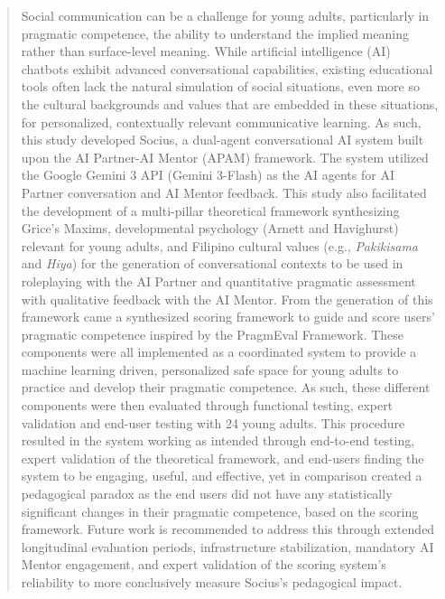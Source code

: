 %
%
%                 

\begin{abstract}

Social communication can be a challenge for young adults, particularly in pragmatic competence, the ability to understand the implied meaning rather than surface-level meaning. While artificial intelligence (AI) 
chatbots exhibit advanced conversational capabilities, existing educational tools often lack the natural simulation of social situations, even more so the cultural backgrounds and values that are embedded in these situations, for personalized, 
contextually relevant communicative learning. As such, this study developed Socius, a dual-agent conversational AI system built upon the AI Partner-AI Mentor (APAM) framework. The system utilized the Google Gemini 3 API (Gemini 3-Flash) as the AI agents
for AI Partner conversation and AI Mentor feedback. This study also facilitated the development of a multi-pillar theoretical framework synthesizing Grice's Maxims, developmental psychology (Arnett and Havighurst) relevant for young adults, and Filipino cultural values (e.g., \textit{Pakikisama} and \textit{Hiya}) for 
the generation of conversational contexts to be used in roleplaying with the AI Partner and quantitative pragmatic assessment with qualitative feedback with the AI Mentor. From the generation of this framework came a synthesized scoring framework to guide and score users'
pragmatic competence inspired by the PragmEval Framework. These components were all implemented as a coordinated system to provide a machine learning driven, personalized safe space for young adults to practice and develop their pragmatic competence. As such, these
different components were then evaluated through functional testing, expert validation and end-user testing with 24 young adults. This procedure resulted in the system working as intended through end-to-end testing, expert validation of the theoretical framework, and end-users finding the system to be engaging, useful, and effective, yet in comparison created
a pedagogical paradox as the end users did not have any statistically significant changes in their pragmatic competence, based on the scoring framework. Future work is recommended to address this through extended longitudinal evaluation periods, infrastructure stabilization, mandatory AI Mentor engagement, and expert validation of the scoring system's reliability to more conclusively measure Socius's pedagogical impact.


\end{abstract}
